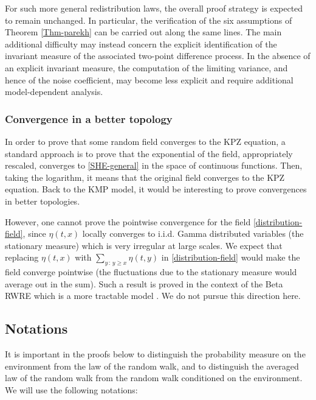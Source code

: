 \documentclass[a4paper,11pt,oneside,reqno]{amsart}
\theoremstyle{definition}
\renewcommand{\geq}{\geqslant}
\numberwithin{equation}{section}
\begin{document}
{\color{black}For such more general redistribution laws, the overall proof strategy is expected to remain unchanged. In particular, the verification of the six assumptions of Theorem \ref{Thm-parekh} can be carried out along the same lines. The main additional difficulty may instead concern the explicit identification of the invariant measure of the associated two-point difference process. In the absence of an explicit invariant measure, the computation of the limiting variance, and hence of the noise coefficient, may become less explicit and require additional model-dependent analysis.}

\subsubsection{Convergence in a better topology}{\color{black}In order to prove that some random field converges to the KPZ equation, a standard approach is to prove that the exponential of the field, appropriately rescaled, converges to \eqref{SHE-general} in the space of continuous functions. Then, taking the logarithm, it means that the original field converges to the KPZ equation.  Back to the KMP model, it would be interesting to prove convergences in better topologies.  }

However, one cannot prove the pointwise convergence for the field \eqref{distribution-field}, since $\eta(t,x)$ locally converges to i.i.d. Gamma distributed variables (the stationary measure) which is very irregular at large scales. We expect that replacing $\eta(t,x)$ with $\sum_{y\,:\,y\geq x}\eta(t,y)$ in  \eqref{distribution-field} would make the field converge pointwise (the fluctuations due to the stationary measure would average out in the sum). Such a result is proved in the context of the Beta RWRE  which is a more tractable  model \cite{das2024multiplicative}. We do not pursue this direction here. 


\subsection{Notations}\label{section-notation}
It is important in the proofs below to distinguish the probability measure on the environment from the law of the random walk, and to distinguish the averaged law of  the random walk from the random walk conditioned on the environment. We will use the following notations:
 
\end{document}
